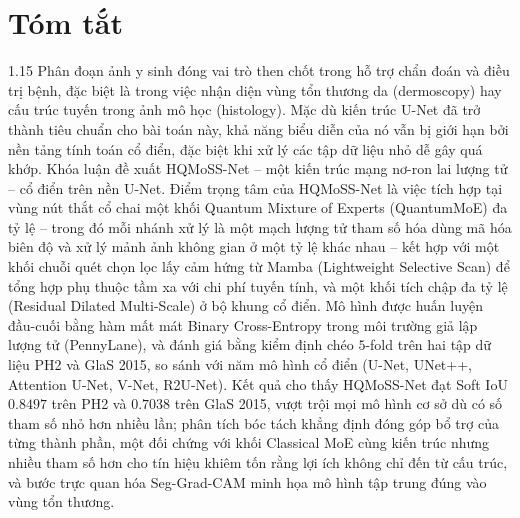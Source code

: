 \chapter*{Tóm tắt}
\label{summary}
\begin{spacing}{1.15}
Phân đoạn ảnh y sinh đóng vai trò then chốt trong hỗ trợ chẩn đoán và điều trị bệnh, đặc biệt là trong việc nhận diện vùng tổn thương da (dermoscopy) hay cấu trúc tuyến trong ảnh mô học (histology). Mặc dù kiến trúc U-Net đã trở thành tiêu chuẩn cho bài toán này, khả năng biểu diễn của nó vẫn bị giới hạn bởi nền tảng tính toán cổ điển, đặc biệt khi xử lý các tập dữ liệu nhỏ dễ gây quá khớp. Khóa luận đề xuất HQMoSS-Net -- một kiến trúc mạng nơ-ron lai lượng tử -- cổ điển trên nền U-Net. Điểm trọng tâm của HQMoSS-Net là việc tích hợp tại vùng nút thắt cổ chai một khối Quantum Mixture of Experts (QuantumMoE) đa tỷ lệ -- trong đó mỗi nhánh xử lý là một mạch lượng tử tham số hóa dùng mã hóa biên độ và xử lý mảnh ảnh không gian ở một tỷ lệ khác nhau -- kết hợp với một khối chuỗi quét chọn lọc lấy cảm hứng từ Mamba (Lightweight Selective Scan) để tổng hợp phụ thuộc tầm xa với chi phí tuyến tính, và một khối tích chập đa tỷ lệ (Residual Dilated Multi-Scale) ở bộ khung cổ điển. Mô hình được huấn luyện đầu-cuối bằng hàm mất mát Binary Cross-Entropy trong môi trường giả lập lượng tử (PennyLane), và đánh giá bằng kiểm định chéo $5$-fold trên hai tập dữ liệu PH2 và GlaS 2015, so sánh với năm mô hình cổ điển (U-Net, UNet++, Attention U-Net, V-Net, R2U-Net). Kết quả cho thấy HQMoSS-Net đạt Soft IoU $0.8497$ trên PH2 và $0.7038$ trên GlaS 2015, vượt trội mọi mô hình cơ sở dù có số tham số nhỏ hơn nhiều lần; phân tích bóc tách khẳng định đóng góp bổ trợ của từng thành phần, một đối chứng với khối Classical MoE cùng kiến trúc nhưng nhiều tham số hơn cho tín hiệu khiêm tốn rằng lợi ích không chỉ đến từ cấu trúc, và bước trực quan hóa Seg-Grad-CAM minh họa mô hình tập trung đúng vào vùng tổn thương.
\end{spacing}